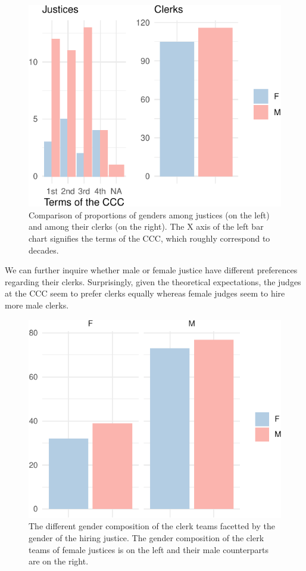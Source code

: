 \documentclass[
  11pt,
]{article}
\begin{document}
\begin{figure}
\centering
\includegraphics{ANONYMIZED_The_Czech_Constitutional_Court_Dataset_files/figure-latex/gender1-1.pdf}
\caption{Comparison of proportions of genders among justices (on the
left) and among their clerks (on the right). The X axis of the left bar
chart signifies the terms of the CCC, which roughly correspond to
decades.}
\end{figure}

We can further inquire whether male or female justice have different
preferences regarding their clerks. Surprisingly, given the theoretical
expectations, the judges at the CCC seem to prefer clerks equally
whereas female judges seem to hire more male clerks.

\begin{figure}
\centering
\includegraphics{ANONYMIZED_The_Czech_Constitutional_Court_Dataset_files/figure-latex/gender2-1.pdf}
\caption{The different gender composition of the clerk teams facetted by
the gender of the hiring justice. The gender composition of the clerk
teams of female justices is on the left and their male counterparts are
on the right.}
\end{figure}
\end{document}

